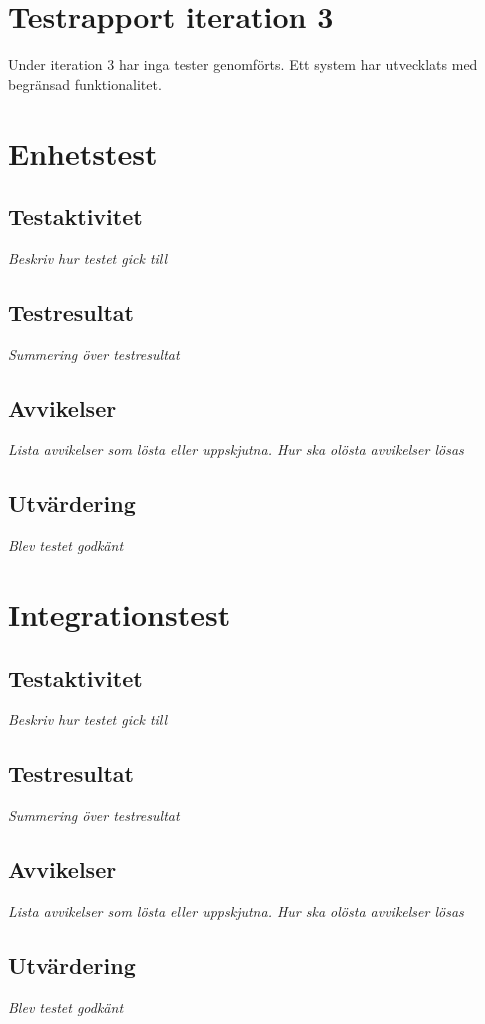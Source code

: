 \documentclass[a4paper,10pt]{article}
\begin{document}


\newpage

\section{Testrapport iteration 3}
Under iteration 3 har inga tester genomförts. Ett system har utvecklats med begränsad funktionalitet.  

\section{Enhetstest}
\subsection{Testaktivitet}
\emph{Beskriv hur testet gick till} 
\subsection{Testresultat}
\emph{Summering över testresultat}
\subsection{Avvikelser}
\emph{Lista avvikelser som lösta eller uppskjutna. Hur ska olösta avvikelser lösas}
\subsection{Utvärdering}
\emph{Blev testet godkänt}
\section{Integrationstest}
\subsection{Testaktivitet}
\emph{Beskriv hur testet gick till}
\subsection{Testresultat}
\emph{Summering över testresultat}
\subsection{Avvikelser}
\emph{Lista avvikelser som lösta eller uppskjutna. Hur ska olösta avvikelser lösas}
\subsection{Utvärdering}
\emph{Blev testet godkänt}
\end{document}
